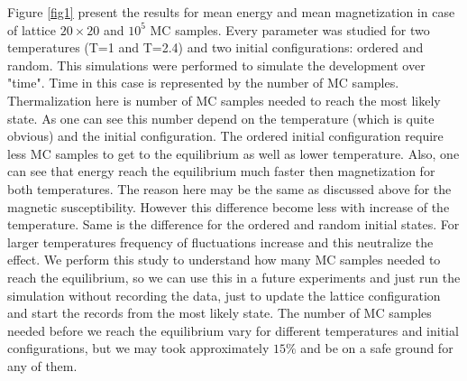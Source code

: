 \documentclass[a4paper]{article}
\begin{document}
Figure \ref{fig1} present the results for mean energy and mean magnetization in case of lattice $20 \times 20$ and $10^5$ MC samples. Every parameter was studied for two temperatures (T=1 and T=2.4) and two initial configurations: ordered and random. This simulations were performed to simulate the development over "time". Time in this case is represented by the number of MC samples. Thermalization here is number of MC samples needed to reach the most likely state. As one can see this number depend on the temperature (which is quite obvious) and the initial configuration. The ordered initial configuration require less MC samples to get to the equilibrium as well as lower temperature. Also, one can see that energy reach the equilibrium much faster then magnetization for both temperatures. The reason here may be the same as discussed above for the magnetic susceptibility. However this difference become less with increase of the temperature. Same is the difference for the ordered and random initial states. For larger temperatures frequency of fluctuations increase and this neutralize the effect. We perform this study to understand how many MC samples needed to reach the equilibrium, so we can use this in a future experiments and just run the simulation without recording the data, just to update the lattice configuration and start the records from the most likely state. The number of MC samples needed before we reach the equilibrium vary for different temperatures and initial configurations, but we may took approximately $15 \%$ and be on a safe ground for any of them.
\end{document}
